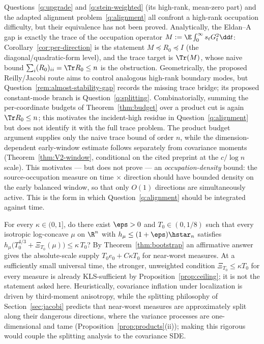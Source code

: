 \documentclass[../../main.tex]{subfiles}
\begin{document}
\begin{remark}
\label{rem:trace-upgrade-unification}
Questions~\ref{q:upgrade} and \ref{q:stein-weighted} (its high-rank, mean-zero part) and the
adapted alignment problem~\ref{q:alignment} all confront a high-rank occupation difficulty, but
their equivalence has not been proved. Analytically, the Eldan--A gap is exactly the trace of the occupation
operator $M:=\E\int_0^\infty s_t G_t^2\dd t$: Corollary~\ref{cor:per-direction} is the
statement $M\preceq R_0\preceq I$ (the diagonal/quadratic-form level), and the trace target is
$\Tr(M)$, whose naive bound $\sum_i(R_0)_{ii}=\Tr R_0\le n$ is the obstruction. Geometrically,
the proposed Reilly/Jacobi route aims to control analogous high-rank boundary modes, but
Question~\ref{rem:almost-stability-gap} records the missing trace bridge; its proposed
constant-mode branch is Question~\ref{q:splitting}. Combinatorially, summing the per-coordinate
budgets of Theorem~\ref{thm:budget} over a product cut is again $\Tr R_0\le n$; this motivates
the incident-high residue in Question~\ref{q:alignment} but does not identify it with the full
trace problem. The product budget argument supplies only the naive trace bound of
order $n$, while the dimension-dependent early-window estimate follows separately from
covariance moments (Theorem~\ref{thm:V2-window}, conditional on the cited preprint at the
$c/\log n$ scale). This motivates --- but does not prove --- an \emph{occupation-density}
bound: the source-occupation measure on time$\,\times\,$direction should have bounded density
on the early balanced window, so that only $O(1)$ directions are simultaneously active. This is the form in which
Question~\ref{q:alignment} should be integrated against time.
\end{remark}

\begin{question}
\label{q:taming}
For every $\kappa\in(0,1]$, do there exist $\eps>0$ and $T_0\in(0,1/8)$ such that every
isotropic log-concave $\mu$
on $\R^n$ with $h_\mu\le(1+\eps)\hstar_n$ satisfies
$h_\mu\bigl(T_0^{4/3}+\Xi_{T_0}(\mu)\bigr)\le\kappa\,T_0$? By
Theorem~\ref{thm:bootstrap} an affirmative answer gives the absolute-scale supply
$T_0e_0+C\kappa T_0$ for near-worst measures. At a sufficiently small universal time, the
stronger, unweighted condition $\Xi_{T_0}\le\kappa T_0$ for every measure is already KLS-sufficient by
Proposition~\ref{prop:ceiling}; it is not the statement asked here. Heuristically, covariance
inflation under localization is driven by third-moment anisotropy, while the splitting
philosophy of Section~\ref{sec:jacobi} predicts that near-worst measures are approximately
split along their dangerous directions, where the variance processes are one-dimensional and
tame (Proposition~\ref{prop:products}(ii)); making this rigorous would couple the splitting
analysis to the covariance SDE.
\end{question}
\end{document}
